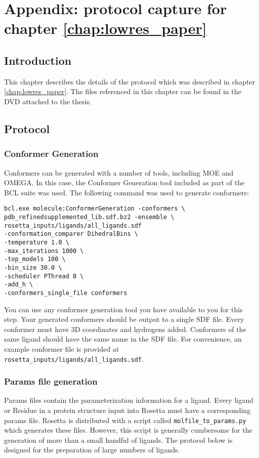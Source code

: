 \chapter{Appendix: protocol capture for chapter \ref{chap:lowres_paper}}
\label{chap:lowres_capture}
\section{Introduction}

This chapter describes the details of the protocol which was described in chapter \ref{chap:lowres_paper}.
The files referenced in this chapter can be found in the DVD attached to the thesis.

\section{Protocol}

\subsection{Conformer Generation}

Conformers can be generated with a number of tools, including MOE and OMEGA.
In this case, the Conformer Generation tool included as part of the \ac{BCL} suite was used.
The following command was used to generate conformers:
\singlespace
\begin{verbatim}
bcl.exe molecule:ConformerGeneration -conformers \
pdb_refinedsupplemented_lib.sdf.bz2 -ensemble \
rosetta_inputs/ligands/all_ligands.sdf 
-conformation_comparer DihedralBins \
-temperature 1.0 \
-max_iterations 1000 \
-top_models 100 \
-bin_size 30.0 \
-scheduler PThread 8 \
-add_h \
-conformers_single_file conformers
\end{verbatim}
\doublespace
You can use any conformer generation tool you have available to you for this step.
Your generated conformers should be output to a single \ac{SDF} file.
Every conformer must have 3D coordinates and hydrogens added.
Conformers of the same ligand should have the same name in the \ac{SDF} file.
For convenience, an example conformer file is provided at \texttt{rosetta\_inputs/ligands/all\_ligands.sdf}.

\subsection{Params file generation}

Params files contain the parameterization information for a ligand.
Every  ligand or Residue in a protein structure input into Rosetta must have a corresponding params file.
Rosetta is distributed with a script called \texttt{molfile\_to\_params.py} which generates these files.
However, this script is generally cumbersome for the generation of more than a small handful of ligands.
The protocol below is designed for the preparation of large numbers of ligands.

